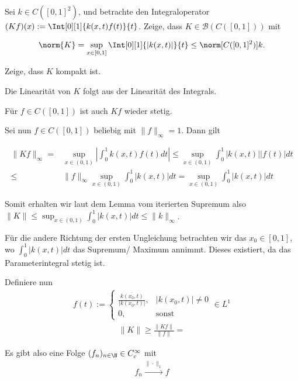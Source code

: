 \begin{exercise}[IO/4]

Sei $k \in C([0, 1]^2)$, und betrachte den Integraloperator $(K f)(x) := \Int[0][1]{k(x, t)f(t)}{t}$.
Zeige, dass $K \in \mathcal{B}(C([0, 1]))$ mit

\begin{align*}
  \norm{K}
  =
  \sup_{x \in [0, 1]} \Int[0][1]{|k(x, t)|}{t}
  \leq
  \norm[{C([0, 1]^2)}]{k}.
\end{align*}

Zeige, dass $K$ kompakt ist.

\end{exercise}

\begin{solution}

Die Linearität von $K$ folgt aus der Linearität des Integrals.

Für $f \in C([0,1])$ ist auch $Kf$ wieder stetig.

Sei nun $f \in C([0,1])$ beliebig mit $\|f\|_{\infty} = 1$. Dann gilt

\begin{align*}
  \|Kf\|_{\infty} =& \sup_{x \in (0,1)} | \int_{0}^{1} k(x,t)f(t)dt | \leq \sup_{x \in (0,1)} \int_{0}^{1} |k(x,t)||f(t)|dt \\
  \leq& \|f\|_{\infty} \sup_{x \in (0,1)} \int_{0}^{1} |k(x,t)|dt = \sup_{x \in (0,1)} \int_{0}^{1} |k(x,t)|dt
\end{align*}

Somit erhalten wir laut dem Lemma vom iterierten Supremum also $\|K\| \leq \sup_{x \in (0,1)} \int_{0}^{1} |k(x,t)|dt \leq \|k\|_{\infty}$.

Für die andere Richtung der ersten Ungleichung betrachten wir das $x_0 \in [0,1]$, wo $\int_{0}^{1} |k(x,t)|dt$ das Supremum/ Maximum annimmt. Dieses existiert, da das Parameterintegral stetig ist.

Definiere nun
\begin{align*}
  f(t) := \begin{cases}
    \frac{\overline{k(x_0,t)}}{|k(x_0,t)|}, & |k(x_0,t)| \neq 0 \\
    0, & \text{sonst}
  \end{cases} \in L^1
\end{align*}
\begin{align*}
  \|K\| \geq \frac{\|Kf\|}{\|f\|} =
\end{align*}

Es gibt also eine Folge $(f_n)_{n \in \N} \in C_c^{\infty}$ mit
\begin{align*}
  f_n \stackrel{\|\cdot\|_1}{\to} f
\end{align*}


\end{solution}
